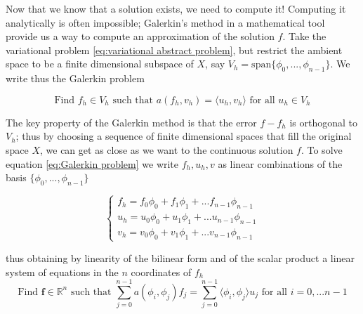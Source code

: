 Now that we know that a solution exists, we need to compute it! Computing it analytically is often impossible; Galerkin's method in a mathematical tool provide us a way to compute an approximation of the solution $f$. Take the variational problem \ref{eq:variational abstract problem}, but restrict the ambient space to be a finite dimensional subspace of $X$, say $V_h = \text{span}\{\phi_0, ..., \phi_{n-1}\}$. We write thus the Galerkin problem
\vspace{0.5cm}

\begin{equation}\label{eq:Galerkin problem}
		\text{Find }f_h\in V_h\text{ such that } a(f_h, v_h)=\langle u_h, v_h\rangle \text{ for all } u_h \in V_h
\end{equation}
\vspace{0.5cm}

The key property of the Galerkin method is that the error $f-f_h$ is orthogonal to $V_h$; thus by choosing a sequence of finite dimensional spaces that fill the original space $X$, we can get as close as we want to the continuous solution $f$.
To solve equation \ref{eq:Galerkin problem} we write $f_h, u_h, v$ as linear combinations of the basis $\{\phi_0, ..., \phi_{n-1}\}$

$$\begin{cases}
f_h = f_0\phi_0 +  f_1\phi_1 + ...  f_{n-1}\phi_{n-1}\\
u_h = u_0\phi_0 +  u_1\phi_1 + ...  u_{n-1}\phi_{n-1}\\
v_h = v_0\phi_0 +  v_1\phi_1 + ...  v_{n-1}\phi_{n-1}
\end{cases}
$$

 thus obtaining by linearity of the bilinear form and of the scalar product a linear system of equations in the $n$ coordinates of $f_h$
\begin{equation}\label{eq:Galerkin problem in the basis functions}
\text{Find }\mathbf f\in\mathbb R^n\text{ such that } \sum_{j=0}^{n-1}a(\phi_i, \phi_j)f_j=\sum_{j=0}^{n-1}\langle \phi_i, \phi_j\rangle u_j \text{ for all } i=0, ... n-1
\end{equation}

